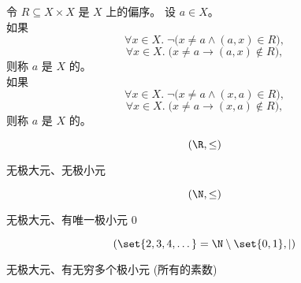 
\begin{frame}{}
  \begin{definition}
    令 $R \subseteq X \times X$ 是 $X$ 上的偏序。
    设 $a \in X$。\\[5pt]

    \pause
    如果
    \[
      \forall x \in X.\; \lnot \big(x \neq a \land (a, x) \in R \big),
    \]
    \[
      \forall x \in X.\; \big(x \neq a \to (a, x) \notin R \big),
    \]
    则称 $a$ 是 $X$ 的。\\[10pt]

    \pause
    如果
    \[
      \forall x \in X.\; \lnot \big(x \neq a \land (x, a) \in R \big),
    \]
    \[
      \forall x \in X.\; \big(x \neq a \to (x, a) \notin R \big),
    \]
    则称 $a$ 是 $X$ 的。
  \end{definition}

  \pause
  \begin{center}
  \end{center}
\end{frame}

\begin{frame}{}
  \begin{exampleblock}{}
    \[
      (\R, \le)
    \]
    \pause
    \begin{center}
      无极大元、无极小元
    \end{center}
  \end{exampleblock}

  \pause
  \begin{exampleblock}{}
    \[
      (\N, \le)
    \]
    \pause
    \begin{center}
      无极大元、有唯一极小元 $0$
    \end{center}
  \end{exampleblock}

  \pause
  \begin{exampleblock}{}
    \[
      (\set{2, 3, 4, \dots} = \N \setminus \set{0, 1}, \mid)
    \]
    \pause
    \begin{center}
      无极大元、有无穷多个极小元 (所有的素数)
    \end{center}
  \end{exampleblock}
\end{frame}

